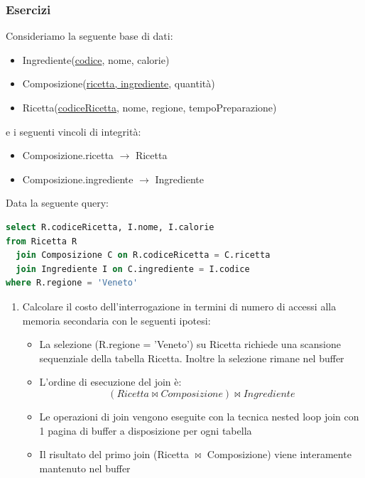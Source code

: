 \documentclass[a4paper,twoside]{article}
\begin{document}
\subsubsection{Esercizi}
\begin{exercise}
  Consideriamo la seguente base di dati:
  \begin{itemize}
    \item Ingrediente(\underline{codice}, nome, calorie)
    \item Composizione(\underline{ricetta, ingrediente}, quantità)
    \item Ricetta(\underline{codiceRicetta}, nome, regione, tempoPreparazione)
  \end{itemize}
  e i seguenti vincoli di integrità:
  \begin{itemize}
    \item Composizione.ricetta \( \to  \) Ricetta
    \item Composizione.ingrediente \( \to  \) Ingrediente
  \end{itemize}
  Data la seguente query:
\begin{lstlisting}[language=sql]
select R.codiceRicetta, I.nome, I.calorie
from Ricetta R
  join Composizione C on R.codiceRicetta = C.ricetta
  join Ingrediente I on C.ingrediente = I.codice
where R.regione = 'Veneto'
\end{lstlisting}
  \begin{enumerate}
    \item Calcolare il costo dell'interrogazione in termini di numero di
      accessi alla memoria secondaria con le seguenti ipotesi:
      \begin{itemize}
        \item La selezione (R.regione = 'Veneto') su Ricetta richiede una
          scansione sequenziale della tabella Ricetta. Inoltre la 
          selezione rimane nel buffer

        \item L'ordine di esecuzione del join è:
          \[
            ( Ricetta \bowtie Composizione ) \bowtie Ingrediente
          \] 

        \item Le operazioni di join vengono eseguite con la tecnica nested
          loop join con 1 pagina di buffer a disposizione per ogni tabella

        \item Il risultato del primo join (Ricetta \(\bowtie\) Composizione)
          viene interamente mantenuto nel buffer


\end{itemize}
\end{enumerate}
\end{exercise}
\end{document}
